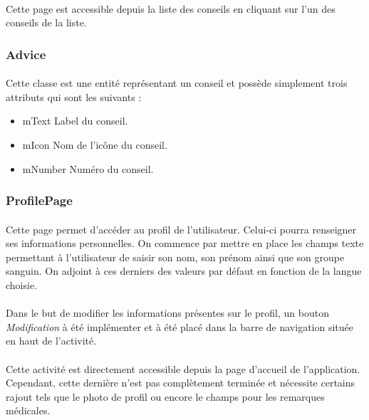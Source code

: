 		\paragraph{}
			Cette page est accessible depuis la liste des conseils en cliquant sur l'un des conseils de la liste.
	\subsubsection{Advice}
		\paragraph{}
			Cette classe est une entité représentant un conseil et possède simplement trois attributs qui sont les suivants :
			\begin{itemize}
				\item mText Label du conseil.
				\item mIcon Nom de l'icône du conseil.
				\item mNumber Numéro du conseil.
			\end{itemize}
	\subsubsection{ProfilePage}	
	\paragraph{}
		Cette page permet d'accéder au profil de l'utilisateur. Celui-ci pourra renseigner ses informations personnelles. On commence par mettre en place les champs texte permettant à l'utilisateur de saisir son nom, son prénom ainsi que son groupe sanguin. On adjoint à ces derniers des valeurs par défaut en fonction de la langue choisie.
	
	\paragraph{}
		Dans le but de modifier les informations présentes sur le profil, un bouton \emph{Modification} à été implémenter et à été placé dans la barre de navigation située en haut de l'activité.
	
	\paragraph{}	
		Cette activité est directement accessible depuis la page d'accueil de l'application. Cependant, cette dernière n'est pas complètement terminée et nécessite certains rajout tels que le photo de profil ou encore le champs pour les remarques médicales.

